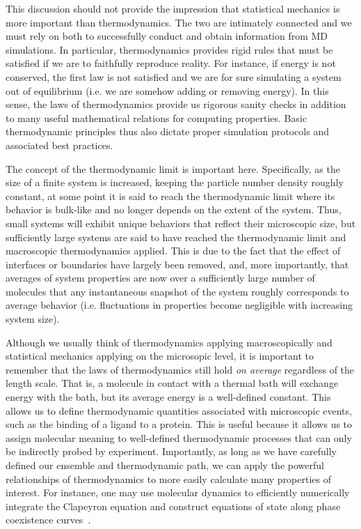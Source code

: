 \documentclass[9pt,bestpractices]{livecoms}
\begin{document}
This discussion should not provide the impression that statistical mechanics is more important than thermodynamics.
The two are intimately connected and we must rely on both to successfully conduct and obtain information from MD simulations.
In particular, thermodynamics provides rigid rules that must be satisfied if we are to faithfully reproduce reality.
For instance, if energy is not conserved, the first law is not satisfied and we are for sure simulating a system out of equilibrium (i.e. we are somehow adding or removing energy).
In this sense, the laws of thermodynamics provide us rigorous sanity checks in addition to many useful mathematical relations for computing properties.
Basic thermodynamic principles thus also dictate proper simulation protocols and associated best practices.

The concept of the thermodynamic limit is important here.
Specifically, as the size of a finite system is increased, keeping the particle number density roughly constant, at some point it is said to reach the thermodynamic limit where its behavior is bulk-like and no longer depends on the extent of the system.
Thus, small systems will exhibit unique behaviors that reflect their microscopic size, but sufficiently large systems are said to have reached the thermodynamic limit and macroscopic thermodynamics applied.
This is due to the fact that the effect of interfaces or boundaries have largely been removed, and, more importantly, that averages of system properties are now over a sufficiently large number of molecules that any instantaneous snapshot of the system roughly corresponds to average behavior (i.e. fluctuations in properties become negligible with increasing system size).

Although we usually think of thermodynamics applying macroscopically and statistical mechanics applying on the microsopic level, it is important to remember that the laws of thermodynamics still hold \textit{on average} regardless of the length scale.
That is, a molecule in contact with a thermal bath will exchange energy with the bath, but its average energy is a well-defined constant.
This allows us to define thermodynamic quantities associated with microscopic events, such as the binding of a ligand to a protein.
This is useful because it allows us to assign molecular meaning to well-defined thermodynamic processes that can only be indirectly probed by experiment.
Importantly, as long as we have carefully defined our ensemble and thermodynamic path, we can apply the powerful relationships of thermodynamics to more easily calculate many properties of interest.
For instance, one may use molecular dynamics to efficiently numerically integrate the Clapeyron equation and construct equations of state along phase coexistence curves~\cite{Kofke1993, GonzalezSalgado2010}.
\end{document}
